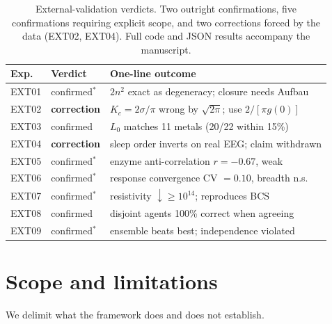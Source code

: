 \documentclass[11pt,twocolumn,a4paper]{article}
\newcommand{\Kc}{K_c}
\begin{document}
\begin{table}[h!]\centering
\small
\begin{tabular}{llp{}}
\toprule
\textbf{Exp.} & \textbf{Verdict} & \textbf{One-line outcome}\\\midrule
EXT01 & confirmed$^\ast$ & $2n^2$ exact as degeneracy; closure needs Aufbau\\
EXT02 & \textbf{correction} & $\Kc=2\sigma/\pi$ wrong by $\sqrt{2\pi}$; use $2/[\pi g(0)]$\\
EXT03 & confirmed & $L_0$ matches 11 metals (20/22 within 15\%)\\
EXT04 & \textbf{correction} & sleep order inverts on real EEG; claim withdrawn\\
EXT05 & confirmed$^\ast$ & enzyme anti-correlation $r=-0.67$, weak\\
EXT06 & confirmed$^\ast$ & response convergence CV $=0.10$, breadth n.s.\\
EXT07 & confirmed$^\ast$ & resistivity $\downarrow\ge10^{14}$; reproduces BCS\\
EXT08 & confirmed & disjoint agents 100\% correct when agreeing\\
EXT09 & confirmed$^\ast$ & ensemble beats best; independence violated\\
\bottomrule
\end{tabular}
\caption{External-validation verdicts. Two outright confirmations, five
confirmations requiring explicit scope, and two corrections forced by the data
(EXT02, EXT04). Full code and JSON results accompany the manuscript.}
\label{tab:external}
\end{table}

\section{Scope and limitations}
\label{sec:scope}

We delimit what the framework does and does not establish.
\end{document}
